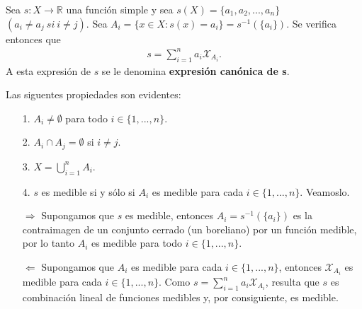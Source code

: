 \begin{defi}
    Sea $s: X \longrightarrow \mathbb{R}$ una función simple y sea $s(X) = \{ a_1, a_2, ..., a_n\}$ $(a_i \not = a_j \ si \ i \not = j)$. Sea $A_i = \{ x \in X : s(x) = a_i\} = s^{-1}(\{ a_i \})$. Se verifica entonces que
    \begin{align*}
        s = \sum_{i = 1}^{n}{a_i \mathcal{X}_{A_i}}.
    \end{align*}
    A esta expresión de $s$ se le denomina \textbf{expresión canónica de s}.
\end{defi}
Las siguentes propiedades son evidentes:
\begin{enumerate}
    \item[1.] $A_i \not = \emptyset$ para todo $i \in \{1, ...,n\}$.
    \item[2.] $A_i \cap A_j = \emptyset$ si $i \not = j$.
    \item[3.] $X = \bigcup_{i=1}^{n}{A_i}$.
    \item[4.] $s$ es medible si y sólo si $A_i$ es medible para cada $i \in \{1, ...,n\}$. Veamoslo.

          $\Rightarrow$ Supongamos que $s$ es medible, entonces $A_i = s^{-1}(\{ a_i\})$ es la contraimagen de un conjunto cerrado (un boreliano) por un función medible, por lo tanto $A_i$ es medible para todo $i \in \{1, ...,n\}$.

          $\Leftarrow$ Supongamos que $A_i$ es medible para cada $i \in \{1, ...,n\}$, entonces $\mathcal{X}_{A_i}$ es medible para cada $i \in \{1, ...,n\}$. Como $s = \sum_{i = 1}^{n}{a_i \mathcal{X}_{A_i}}$, resulta que $s$ es combinación lineal de funciones medibles y, por consiguiente, es medible.
\end{enumerate}


